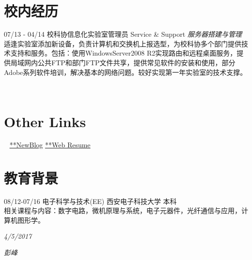 \documentclass[]{friggeri-cv}
\begin{document}
\section{校内经历}
\begin{entrylist}
  \entry
    {07/13 - 04/14}
    {校科协信息化实验室管理员}
    {Service \& Support}
    {\emph{服务器搭建与管理}
    适逢实验室添加新设备，负责计算机和交换机上报选型，为校科协多个部门提供技术支持和服务。包括：使用WindowsServer2008 R2实现路由和远程桌面服务，提供局域网内公共FTP和部门FTP文件共享，提供常见软件的安装和使用，部分Adobe系列软件培训，解决基本的网络问题。较好实现第一年实验室的技术支撑。  \\     
    }
    
\end{entrylist}






\begin{aside}
~
~ 
  ~    
  \section{Other Links}
    ~
    {\href{https://blog.mxuan.me}{**NewBlog}}
    {\href{https://resume.mxuan.me}{**Web Resume}}
   ~
   ~
\end{aside}




\section{教育背景}
08/12\hspace{1mm}-\hspace{1mm}07/16 \hspace{27mm} 电子科学与技术(EE) \hspace{7mm}  西安电子科技大学  \hspace{7mm}  本科 \\

相关课程与内容：数字电路，微机原理与系统，电子元器件，光纤通信与应用，计算机图形学。\\

\begin{flushleft}

\emph{4/5/2017}
\end{flushleft}
\begin{flushright}
\emph{彭峰}
\end{flushright}
\end{document}
